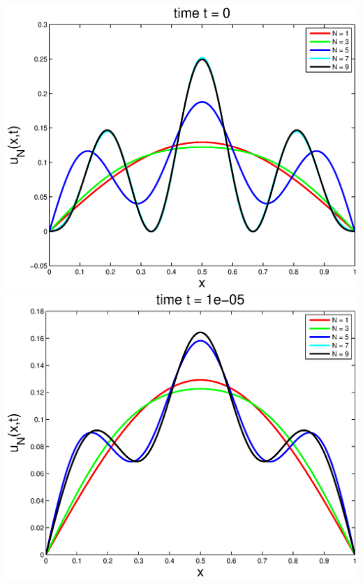 \begin{solution}
\begin{enumerate}
\begin{center}
\includegraphics[scale=0.4]{fourth_a}
\includegraphics[scale=0.4]{fourth_b}


\end{center}
\end{enumerate}
\end{solution}
